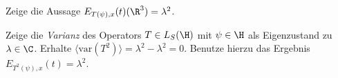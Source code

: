 \documentclass{subfiles}
\begin{document}
            \begin{Aufgabe}
                \nr{} Zeige die Aussage $E_{T(\psi),x}(t)(\R^3) = \lambda^2$. 

                \nr{} Zeige die \emph{Varianz} des Operators $T\in L_S(\H)$ mit $\psi\in\H$ als Eigenzustand zu $\lambda\in\C$. Erhalte $\langle \text{var}(T^2)\rangle = \lambda^2-\lambda^2 = 0$. Benutze hierzu das Ergebnis $E_{T^2(\psi),x}(t) = \lambda^2$. 
            \end{Aufgabe}
\end{document}
